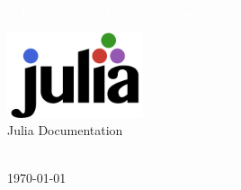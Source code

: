 
\begin{titlingpage}
    \BgThispage
    \vspace*{2cm}\noindent

    \textcolor{white}{ \MainHeading  \DocMainTitle } 
    \\[0.6cm]
    \textcolor{white}{
        \SecondaryHeading A fresh approach to technical computing.
    }
    \vspace*{3cm}\par\noindent

    \begin{center}
        \includegraphics[width=0.3\textwidth]{./assets/logo} 
        \\[1.5cm]
        { \SecondaryHeading Julia \DocVersion Documentation } 
        \vfill
        
        { \huge  \DocAuthors }
        \\[0.5cm]
        { \huge \today }
    \end{center} 
\end{titlingpage}
\restoregeometry
